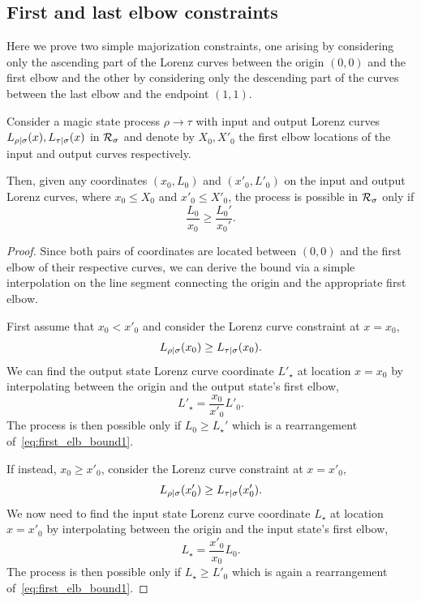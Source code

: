 \subsection{First and last elbow constraints}
\label{app:elb_constraints}
Here we prove two simple majorization constraints, one arising by considering only the ascending part of the Lorenz curves between the origin $(0,0)$ and the first elbow and the other by considering only the descending part of the curves between the last elbow and the endpoint $(1,1)$.
\begin{proposition}\label{prop:first_elb}
	Consider a magic state process $\rho \longrightarrow \tau$ with input and output Lorenz curves ${L_{\rho|\sigma}}(x), {L_{\tau|\sigma}}(x)$ in ${\mathcal R}_\sigma$ and denote by $X_0, X'_0$ the first elbow locations of the input and output curves respectively.
	
	Then, given any coordinates $(x_0, L_0)$ and $(x'_0, L'_0)$ on the input and output Lorenz curves, where $x_0 \leq X_0$ and $x'_0 \leq X'_0$, the process is possible in ${\mathcal R}_\sigma$ only if
\begin{equation}\label{eq:first_elb_bound1}
	\frac{L_0}{x_0} \geq \frac{L_0'}{x_0'}.
\end{equation}
\end{proposition}
\begin{proof}
Since both pairs of coordinates are located between $(0,0)$ and the first elbow of their respective curves, we can derive the bound via a simple interpolation on the line segment connecting the origin and the appropriate first elbow.

First assume that $x_0 < x'_0$ and consider the Lorenz curve constraint at $x = x_0$,
\begin{equation}
	{L_{\rho|\sigma}}(x_0) \geq {L_{\tau|\sigma}}(x_0).
\end{equation}
We can find the output state Lorenz curve coordinate $L'_\star$ at location $x = x_0$ by interpolating between the origin and the output state's first elbow, 
\begin{equation}
	L'_\star = \frac{x_0}{x'_0}L'_0.
\end{equation}
The process is then possible only if $L_0 \geq L_\star'$ which is a rearrangement of~\cref{eq:first_elb_bound1}.

If instead, $x_0 \geq x'_0$, consider the Lorenz curve constraint at $x = x'_0$,
\begin{equation}
	{L_{\rho|\sigma}}(x'_0) \geq {L_{\tau|\sigma}}(x'_0).
\end{equation}
We now need to find the input state Lorenz curve coordinate $L_\star$ at location $x = x'_0$ by interpolating between the origin and the input state's first elbow, 
\begin{equation}
	L_\star = \frac{x'_0}{x_0}L_0.
\end{equation}
The process is then possible only if $L_\star \geq L'_0$ which is again a rearrangement of~\cref{eq:first_elb_bound1}.
\end{proof}

